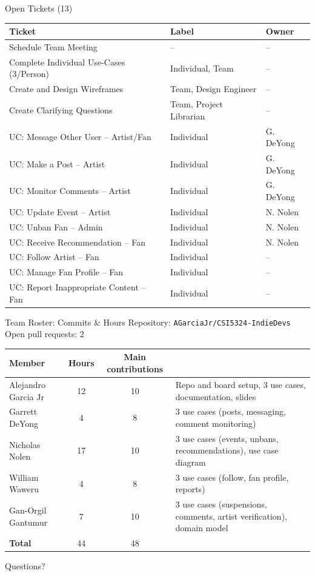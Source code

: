 \documentclass[11pt,aspectratio=169]{beamer}
\begin{document}
\begin{frame}{Open Tickets (13)}
\footnotesize
\begin{tabular}{@{}lll@{}}
\toprule
Ticket & Label & Owner \\
\midrule
Schedule Team Meeting & -- & -- \\
Complete Individual Use-Cases (3/Person) & Individual, Team & -- \\
Create and Design Wireframes & Team, Design Engineer & -- \\
Create Clarifying Questions & Team, Project Librarian & -- \\
UC: Message Other User -- Artist/Fan & Individual & G. DeYong \\
UC: Make a Post -- Artist & Individual & G. DeYong \\
UC: Monitor Comments -- Artist & Individual & G. DeYong \\
UC: Update Event -- Artist & Individual & N. Nolen \\
UC: Unban Fan -- Admin & Individual & N. Nolen \\
UC: Receive Recommendation -- Fan & Individual & N. Nolen \\
UC: Follow Artist -- Fan & Individual & -- \\
UC: Manage Fan Profile -- Fan & Individual & -- \\
UC: Report Inappropriate Content -- Fan & Individual & -- \\
\bottomrule
\end{tabular}
\end{frame}


\begin{frame}{Team Roster: Commits \& Hours}
\small
Repository: \texttt{AGarciaJr/CSI5324-IndieDevs} \hfill Open pull requests: 2

\vspace{0.6em}
\footnotesize
\begin{tabular}{@{}lccp{}@{}}
\toprule
Member & Hours & Main contributions \\
\midrule
Alejandro Garcia Jr & 12 & 10 & Repo and board setup, 3 use cases, documentation, slides \\
Garrett DeYong & 4 & 8 & 3 use cases (posts, messaging, comment monitoring) \\
Nicholas Nolen & 17 & 10 & 3 use cases (events, unbans, recommendations), use case diagram\\
William Waweru & 4 & 8 & 3 use cases (follow, fan profile, reports) \\
Gan-Orgil Gantumur & 7 & 10 & 3 use cases (suspensions, comments, artist verification), domain model \\
\midrule
\textbf{Total} & 44 & 48 & \\
\bottomrule
\end{tabular}
\end{frame}


\begin{frame}[standout]
Questions?
\end{frame}
\end{document}
